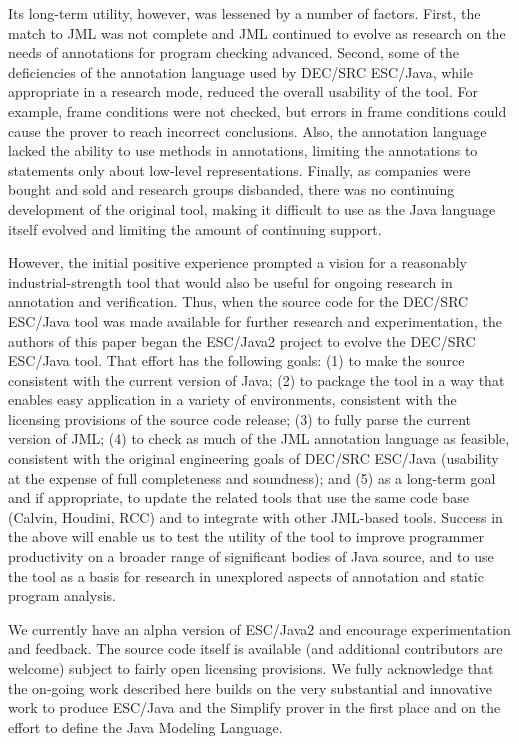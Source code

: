 \documentclass{acm_proc_article-sp}
\begin{document}
Its long-term utility, however, was lessened by a number of factors.
First, the match to JML was not complete and JML continued to evolve
as research on the needs of annotations for program checking advanced.
Second, some of the deficiencies of the annotation language used by
DEC/SRC ESC/Java, while appropriate in a research mode, reduced the
overall usability of the tool.  For example, frame conditions were not
checked, but errors in frame conditions could cause the prover to
reach incorrect conclusions.  Also, the annotation language lacked the
ability to use methods in annotations, limiting the annotations to
statements only about low-level representations.  Finally, as
companies were bought and sold and research groups disbanded, there
was no continuing development of the original tool, making it
difficult to use as the Java language itself evolved and limiting the
amount of continuing support.

However, the initial positive experience prompted a vision for a
reasonably industrial-strength tool that would also be useful for
ongoing research in annotation and verification.  Thus, when the
source code for the DEC/SRC ESC/Java tool was made available for
further research and experimentation, the authors of this paper began
the ESC/Java2 project to evolve the DEC/SRC ESC/Java tool.  That
effort has the following goals:
(1) to make the source consistent with the current version of Java;
(2) to package the tool in a way that enables easy application in a
variety of environments, consistent with the licensing provisions of
the source code release;
(3) to fully parse the current version of JML;
(4) to check as much of the JML annotation language as feasible,
consistent with the original engineering goals of DEC/SRC ESC/Java
(usability at the expense of full completeness and soundness); and
(5) as a long-term goal and if appropriate, to update the related
tools that use the same code base (Calvin, Houdini, RCC) and to
integrate with other JML-based tools.  Success in the above will
enable us to test the utility of the tool to improve programmer
productivity on a broader range of significant bodies of Java source,
and to use the tool as a basis for research in unexplored aspects of
annotation and static program analysis.
  
We currently have an alpha version of ESC/Java2
 and encourage experimentation and feedback.  The source
code itself is available (and additional contributors are welcome)
subject to fairly open licensing provisions.  We fully acknowledge
that the on-going work described here builds on the very substantial
and innovative work to produce ESC/Java and the Simplify prover in the
first place and on the effort to define the Java Modeling Language.
\end{document}

